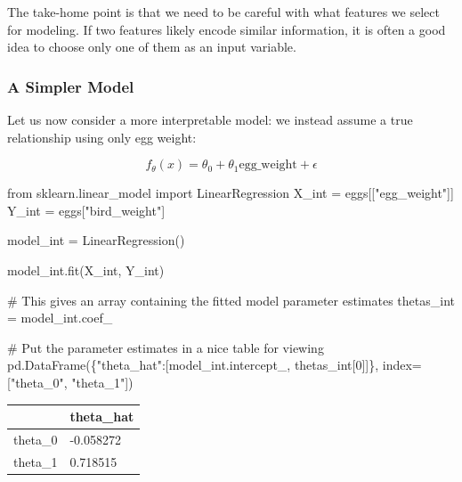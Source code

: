 \documentclass[
  letterpaper,
  DIV=11,
  numbers=noendperiod]{scrreprt}
\newenvironment{Shaded}{\begin{snugshade}}{\end{snugshade}}
\newcommand{\CommentTok}[1]{\textcolor[rgb]{0.37,0.37,0.37}{#1}}
\newcommand{\DecValTok}[1]{\textcolor[rgb]{0.68,0.00,0.00}{#1}}
\newcommand{\ImportTok}[1]{\textcolor[rgb]{0.00,0.46,0.62}{#1}}
\newcommand{\NormalTok}[1]{\textcolor[rgb]{0.00,0.23,0.31}{#1}}
\newcommand{\OperatorTok}[1]{\textcolor[rgb]{0.37,0.37,0.37}{#1}}
\newcommand{\StringTok}[1]{\textcolor[rgb]{0.13,0.47,0.30}{#1}}
\begin{document}
The take-home point is that we need to be careful with what features we
select for modeling. If two features likely encode similar information,
it is often a good idea to choose only one of them as an input variable.

\subsubsection{A Simpler Model}\label{a-simpler-model}

Let us now consider a more interpretable model: we instead assume a true
relationship using only egg weight:

\[f_\theta(x) = \theta_0 + \theta_1 \text{egg\_weight} + \epsilon\]

\begin{Shaded}
\begin{Highlighting}[]
\ImportTok{from}\NormalTok{ sklearn.linear\_model }\ImportTok{import}\NormalTok{ LinearRegression}
\NormalTok{X\_int }\OperatorTok{=}\NormalTok{ eggs[[}\StringTok{"egg\_weight"}\NormalTok{]]}
\NormalTok{Y\_int }\OperatorTok{=}\NormalTok{ eggs[}\StringTok{"bird\_weight"}\NormalTok{]}

\NormalTok{model\_int }\OperatorTok{=}\NormalTok{ LinearRegression()}

\NormalTok{model\_int.fit(X\_int, Y\_int)}

\CommentTok{\# This gives an array containing the fitted model parameter estimates}
\NormalTok{thetas\_int }\OperatorTok{=}\NormalTok{ model\_int.coef\_}

\CommentTok{\# Put the parameter estimates in a nice table for viewing}
\NormalTok{pd.DataFrame(\{}\StringTok{"theta\_hat"}\NormalTok{:[model\_int.intercept\_, thetas\_int[}\DecValTok{0}\NormalTok{]]\}, index}\OperatorTok{=}\NormalTok{[}\StringTok{"theta\_0"}\NormalTok{, }\StringTok{"theta\_1"}\NormalTok{])}
\end{Highlighting}
\end{Shaded}

\begin{longtable}[]{@{}ll@{}}
\toprule\noalign{}
& theta\_hat \\
\midrule\noalign{}
\endhead
\bottomrule\noalign{}
\endlastfoot
theta\_0 & -0.058272 \\
theta\_1 & 0.718515 \\
\end{longtable}
\end{document}
